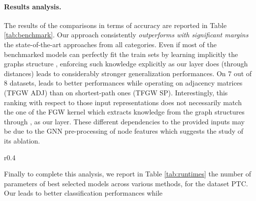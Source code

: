 \documentclass{article}
\begin{document}
\paragraph{Results analysis.} The results of the comparisons in terms of accuracy
are reported in Table \ref{tab:benchmark}. Our  approach consistently
\emph{outperforms with significant margins} the state-of-the-art approaches from all
categories. Even if most of the benchmarked models can perfectly fit the train sets by learning implicitly the graphs structure \cite{xu2018powerful,papp2021dropgnn,maron2019provably}, enforcing such knowledge explicitly as our  layer does (through  distances) leads to considerably stronger generalization performances. On 7 out of 8 datasets,  leads to better performances while operating on adjacency matrices (TFGW ADJ) than on shortest-path ones (TFGW SP).
Interestingly, this ranking with respect to those input representations does not
necessarily match the one of the FGW kernel which extracts knowledge from the
graph structures  through , as our  layer. These different
dependencies to the provided inputs may be due to the GNN pre-processing of node
features which suggests the study of its ablation. \begin{wraptable}{r}{0.4\textwidth} 
	\vspace{-5mm}
	\caption{Number of parameters and averaged prediction time per graph. } \label{tab:runtimes}
	\begin{center}
	\end{center}
\end{wraptable}
Finally to complete this analysis, we report in Table \ref{tab:runtimes}
the number of parameters of best selected models across various methods, for the
dataset PTC. Our  leads to better classification performances while
\end{document}
